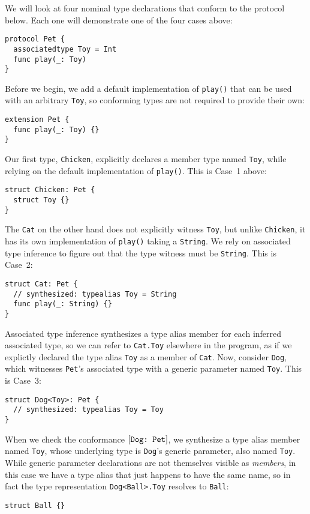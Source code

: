 \documentclass[../generics]{subfiles}
\begin{document}
\begin{example}\label{type witness example}
We will look at four nominal type declarations that conform to the protocol below. Each one will demonstrate one of the four cases above:
\begin{Verbatim}
protocol Pet {
  associatedtype Toy = Int
  func play(_: Toy)
}
\end{Verbatim}
Before we begin, we add a default implementation of \texttt{play()} that can be used with an arbitrary \texttt{Toy}, so conforming types are not required to provide their own:
\begin{Verbatim}
extension Pet {
  func play(_: Toy) {}
}
\end{Verbatim}
Our first type, \texttt{Chicken}, explicitly declares a member type named \texttt{Toy}, while relying on the default implementation of \texttt{play()}. This is Case~1 above:
\begin{Verbatim}
struct Chicken: Pet {
  struct Toy {}
}
\end{Verbatim}
The \texttt{Cat} on the other hand does not explicitly witness \texttt{Toy}, but unlike \texttt{Chicken}, it has its own implementation of \texttt{play()} taking a \texttt{String}. We rely on associated type inference to figure out that the type witness must be \texttt{String}. This is Case~2:
\begin{Verbatim}
struct Cat: Pet {
  // synthesized: typealias Toy = String
  func play(_: String) {}
}
\end{Verbatim}
Associated type inference synthesizes a type alias member for each inferred associated type, so we can refer to \texttt{Cat.Toy} elsewhere in the program, as if we explictly declared the type alias \texttt{Toy} as a member of \texttt{Cat}. Now, consider \texttt{Dog}, which witnesses \texttt{Pet}'s associated type with a generic parameter named \texttt{Toy}. This is Case~3:
\begin{Verbatim}
struct Dog<Toy>: Pet {
  // synthesized: typealias Toy = Toy
}
\end{Verbatim}
When we check the conformance $[\texttt{Dog:~Pet}]$, we synthesize a type alias member named \texttt{Toy}, whose underlying type is \texttt{Dog}'s generic parameter, also named \texttt{Toy}. While generic parameter declarations are not themselves visible as \emph{members}, in this case we have a type alias that just happens to have the same name, so in fact the type representation \texttt{Dog<Ball>.Toy} resolves to \texttt{Ball}:
\begin{Verbatim}
struct Ball {}


\end{Verbatim}
\end{example}
\end{document}
